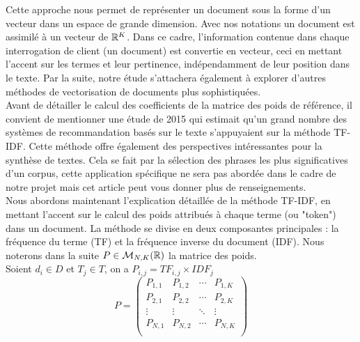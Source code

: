 \documentclass[12pt]{article}
\theoremstyle{definition}
\begin{document}
	Cette approche nous permet de représenter un document sous la forme d'un vecteur dans un espace de grande dimension. Avec nos notations un document est assimilé à un vecteur de $\mathbb{R}^K$. Dans ce cadre, l'information contenue dans chaque interrogation de client (un document) est convertie en vecteur, ceci en mettant l'accent sur les termes et leur pertinence, indépendamment de leur position dans le texte. Par la suite, notre étude s'attachera également à explorer d'autres méthodes de vectorisation de documents plus sophistiquées.\\
	
	Avant de détailler le calcul des coefficients de la matrice des poids de référence, il convient de mentionner une étude de 2015 \cite{etude2015} qui estimait qu'un grand nombre des systèmes de recommandation basés sur le texte s'appuyaient sur la méthode TF-IDF. Cette méthode offre également des perspectives intéressantes pour la synthèse de textes. Cela se fait par la sélection des phrases les plus significatives d'un corpus, cette application spécifique ne sera pas abordée dans le cadre de notre projet mais cet article \cite{TFIDFsumup} peut vous donner plus de renseignements.\\
	
	Nous abordons maintenant l'explication détaillée de la méthode TF-IDF, en mettant l'accent sur le calcul des poids attribués à chaque terme (ou "token") dans un document. La méthode se divise en deux composantes principales : la fréquence du terme (TF) et la fréquence inverse du document (IDF). Nous noterons dans la suite $P\in \mathcal{M}_{N,K}(\mathbb{R})$ la matrice des poids.\\
	
	
	Soient $d_i\in D$ et $T_j\in T$, on a $P_{i,j} = TF_{i,j}\times IDF_j$
	$$P = \begin{pmatrix}
		P_{1,1} & P_{1,2} & \cdots & P_{1,K} \\
		P_{2,1} & P_{2,2} & \cdots & P_{2,K} \\
		\vdots  & \vdots  & \ddots & \vdots  \\
		P_{N,1} & P_{N,2} & \cdots & P_{N,K} \\
	\end{pmatrix}$$
	
\end{document}
